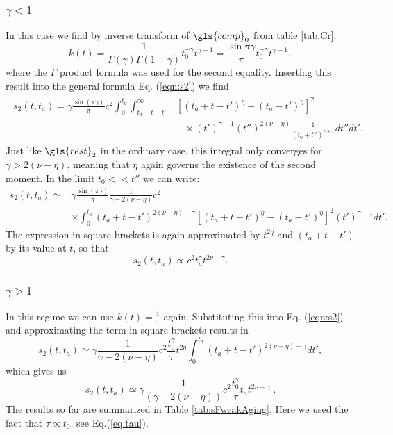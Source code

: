 \subsubsection{$\gamma<1$}
In this case we find by inverse transform of $\gls{comp}_0$ from table \ref{tab:Cr}:
\begin{equation}
 k(t) = \frac{1}{\Gamma(\gamma) \Gamma(1-\gamma)} t_0^{-\gamma} t^{\gamma-1} = \frac{\sin \pi \gamma}{\pi} t_0^{-\gamma} t^{\gamma-1} \label{eqn:kGammaSmall},
\end{equation}
%
where the $\Gamma$ product formula was used for the second equality. Inserting this result into the general formula Eq. (\ref{eqn:s2}) we find
\begin{align}
\begin{split}
s_2(t,t_a) = \gamma\frac{\sin(\pi \gamma)}{\pi}  c^2  \int_0^{t_a} \int^{\infty}_{t_a+t-t'} & [(t_a+t-t')^\eta-(t_a-t')^{\eta}]^2 \\
& \;\;\; \times   (t')^{\gamma-1}  (t'')^{2(\nu-\eta)} \frac{1}{(t_0+t'')^{\gamma+1}} dt'' dt' .
\end{split}
\end{align}
%
Just like $\gls{rest}_2$ in the ordinary case, this integral only converges for $\gamma>2(\nu-\eta)$, meaning that $\eta$ again governs the existence of the second moment. In the limit $t_0<< t''$ we can write:
\begin{align}
s_2(t,t_a) \simeq &  \gamma\frac{\sin(\pi \gamma)}{\pi} \frac{ 1 }{\gamma-2(\nu-\eta)} c^2 \\
&   \times \int_0^{t_a} (t_a+t-t')^{2(\nu-\eta)-\gamma} [(t_a+t-t')^\eta-(t_a-t')^{\eta}]^2 (t')^{\gamma-1}  dt' \nonumber .
\end{align}
The expression in square brackets is again approximated by $t^{2\eta}$ and $(t_a+t-t')$ by its value at $t$, so that
\begin{equation}
 s_2(t,t_a) \propto c^2 t_a^\gamma t^{2\nu -\gamma}. 
\end{equation}

\subsubsection{$\gamma>1$}
In this regime we can use $k(t)=\frac{1}{\tau}$ again. Substituting this into Eq. (\ref{eqn:s2}) and  approximating the term in square brackets results in
%
\begin{equation}
s_2(t,t_a) \simeq \gamma \frac{1}{\gamma-2(\nu-\eta)}c^2 \frac{t_0^{\gamma}}{\tau} t^{2\eta} \int_{0}^{t_a} (t_a+t-t')^{2(\nu-\eta)-\gamma} dt'  ,
\end{equation}
%
which gives us
%
\begin{equation}
s_2(t,t_a) \simeq \gamma \frac{1}{(\gamma-2(\nu-\eta))} c^2\frac{t_0^{\gamma}}{\tau} t_a t^{2\nu-\gamma} \; .
\end{equation}
The results so far are summarized in Table \ref{tab:sFweakAging}. Here we used the fact that $\tau \propto t_0$, see Eq.(\ref{eq:tau}). 

